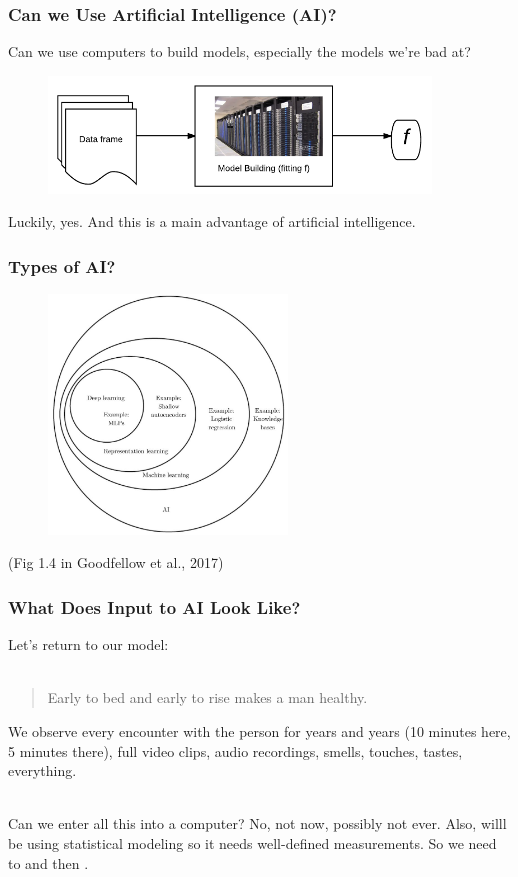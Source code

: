 \documentclass[handout]{beamer}
\begin{document}
\begin{frame}\frametitle{Can we Use Artificial Intelligence (AI)?}

Can we use computers to build models, especially the models we're bad at?  \pause 

\begin{figure}
\centering
\includegraphics[width=4in]{machine_learning}
\end{figure}
	
Luckily, yes. And this is a main advantage of artificial intelligence.

\end{frame}

\begin{frame}\frametitle{Types of AI?}

\begin{figure}
\centering
\includegraphics[width=2.5in]{fig14.jpg}
\end{figure}

(Fig 1.4 in Goodfellow et al., 2017)

\end{frame}

\begin{frame}\frametitle{What Does Input to AI Look Like?}

Let's return to our model:\\~\\

\begin{quotation}
Early to bed and early to rise makes a man healthy.
\end{quotation}

We observe every encounter with the person for years and years (10 minutes here, 5 minutes there), full video clips, audio recordings, smells, touches, tastes, everything.\\~\\ \pause 

Can we enter all this into a computer? No, not now, possibly not ever. Also, willl be using statistical modeling so it needs well-defined measurements. So we need to  and then .

	
\end{frame}
\end{document}
